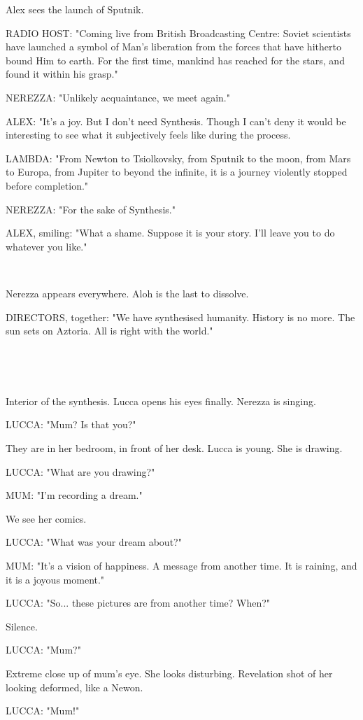 \documentclass[11pt]{article}
\begin{document}
Alex sees the launch of Sputnik.

RADIO HOST: "Coming live from British Broadcasting Centre: Soviet scientists have launched a symbol of Man's liberation from the forces that have hitherto bound Him to earth. For the first time, mankind has reached for the stars, and found it within his grasp."

NEREZZA: "Unlikely acquaintance, we meet again."

ALEX: "It's a joy. 
But I don't need Synthesis.
Though I can't deny it would be interesting to see what it subjectively feels like during the process.

LAMBDA: "From Newton to Tsiolkovsky, from Sputnik to the moon, from Mars to Europa, from Jupiter to beyond the infinite, it is a journey violently stopped before completion."

NEREZZA: "For the sake of Synthesis."

ALEX, smiling: "What a shame.
Suppose it is your story.
I'll leave you to do whatever you like."

\ 

Nerezza appears everywhere.
Aloh is the last to dissolve.

DIRECTORS, together: "We have synthesised humanity.
History is no more.
The sun sets on Aztoria.
All is right with the world."

\ 

\ 

Interior of the synthesis. 
Lucca opens his eyes finally. 
Nerezza is singing.

LUCCA: "Mum? Is that you?"

They are in her bedroom, in front of her desk.
Lucca is young.
She is drawing. 

LUCCA: "What are you drawing?"

MUM: "I'm recording a dream."

We see her comics.

LUCCA: "What was your dream about?"

MUM: "It's a vision of happiness. 
A message from another time.
It is raining, and it is a joyous moment."

LUCCA: "So... these pictures are from another time?
When?"

Silence.

LUCCA: "Mum?"

Extreme close up of mum's eye.
She looks disturbing.
Revelation shot of her looking deformed, like a Newon.

LUCCA: "Mum!"
\end{document}
